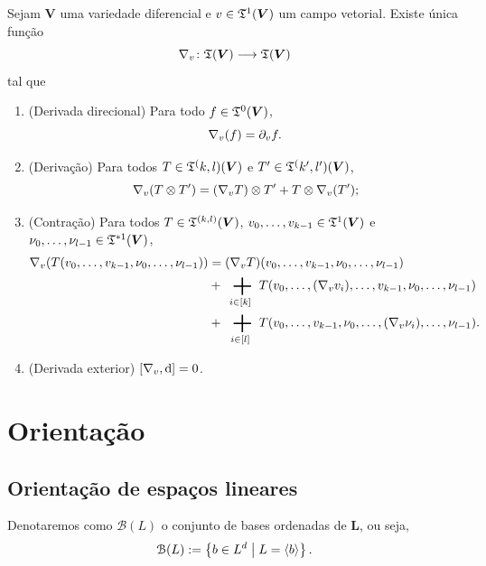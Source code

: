 \begin{proposition}
Sejam $\bm V$ uma variedade diferencial e $v \in \mathfrak{T}^1(\bm V)$ um campo vetorial. Existe única função
	\begin{equation*}
	{\nabla_v}\colon {\mathfrak{T}(\bm V)} \longrightarrow {\mathfrak{T}(\bm V)}
	\end{equation*}
tal que
	\begin{enumerate}
	\item (Derivada direcional) Para todo $f \in \mathfrak{T}^0(\bm V)$,
		\begin{equation*}
		\nabla_v(f) = \partial_v f.
		\end{equation*}
	\item (Derivação) Para todos $T \in \mathfrak{T}^(k,l)(\bm V)$ e $T' \in \mathfrak{T}^(k',l')(\bm V)$,
		\begin{equation*}
		\nabla_v(T \otimes T') = (\nabla_v T) \otimes T' + T \otimes \nabla_v (T');
		\end{equation*}
	\item (Contração) Para todos $T \in \mathfrak{T}^{(k,l)}(\bm V)$, $v_0,\ldots,v_{k-1} \in \mathfrak{T}^1(\bm V)$ e $\nu_0,\ldots,\nu_{l-1} \in \mathfrak{T}^{*1}(\bm V)$,
		\begin{align*}
		\Dir_v (T(v_0,\ldots,v_{k-1},\nu_0,\ldots,\nu_{l-1})) &= (\Dir_v T)(v_0,\ldots,v_{k-1},\nu_0,\ldots,\nu_{l-1}) \\
			&+ \sum_{i \in [k]} T(v_0,\ldots,(\Dir_v v_i),\ldots,v_{k-1},\nu_0,\ldots,\nu_{l-1}) \\
			&+ \sum_{i \in [l]} T(v_0,\ldots,v_{k-1},\nu_0,\ldots,(\Dir_v \nu_i),\ldots,\nu_{l-1}).
		\end{align*}
	\item (Derivada exterior) $\left[{\nabla_v},{\mathrm{d}}\right]=0$.
	\end{enumerate}
\end{proposition}





\section{Orientação}

\subsection{Orientação de espaços lineares}

Denotaremos como $\mathcal{B}(L)$ o conjunto de bases ordenadas de $\bm L$, ou seja,
	\begin{equation*}
	\mathcal{B}(L) := \left\{{b \in L^d}\;\middle\vert\;{L = \left\langle b \right\rangle}\right\}.
	\end{equation*}

